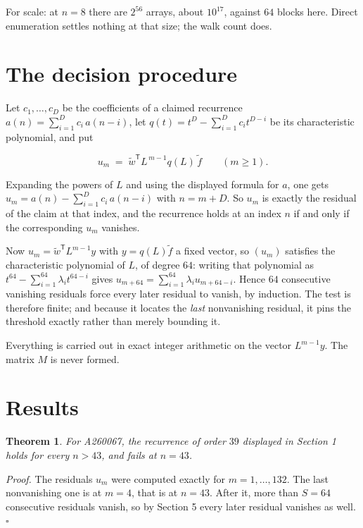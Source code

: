 \documentclass[11pt]{article}
\newtheorem{theorem}{Theorem}
\theoremstyle{definition}
\begin{document}
For scale: at $n = 8$ there are $2^{56}$ arrays, about $10^{17}$, against $64$ blocks here. Direct enumeration settles nothing at that size; the walk count does.

\section{The decision procedure}

Let $c_1,\dots,c_D$ be the coefficients of a claimed recurrence $a(n) = \sum_{i=1}^{D} c_i\,a(n-i)$, let $q(t) = t^{D} - \sum_{i=1}^{D} c_i t^{D-i}$ be its characteristic polynomial, and put

\[u_m \;=\; \tilde w^{\mathsf T} L^{\,m-1} q(L)\,\tilde f \qquad (m \ge 1).\]

Expanding the powers of $L$ and using the displayed formula for $a$, one gets $u_m = a(n) - \sum_{i=1}^{D} c_i\,a(n-i)$ with $n = m + D$. So $u_m$ is exactly the residual of the claim at that index, and the recurrence holds at an index $n$ if and only if the corresponding $u_m$ vanishes.

Now $u_m = \tilde w^{\mathsf T} L^{m-1} y$ with $y = q(L)\tilde f$ a fixed vector, so $(u_m)$ satisfies the characteristic polynomial of $L$, of degree $64$: writing that polynomial as $t^{64} - \sum_{i=1}^{64} \lambda_i t^{64-i}$ gives $u_{m+64} = \sum_{i=1}^{64} \lambda_i u_{m+64-i}$. Hence $64$ consecutive vanishing residuals force every later residual to vanish, by induction. The test is therefore finite; and because it locates the {\itshape last} nonvanishing residual, it pins the threshold exactly rather than merely bounding it.

Everything is carried out in exact integer arithmetic on the vector $L^{m-1}y$. The matrix $M$ is never formed.

\section{Results}

\begin{theorem} For A260067, the recurrence of order $39$ displayed in Section 1 holds for every $n > 43$, and fails at $n = 43$.\end{theorem}

{\itshape Proof.} The residuals $u_m$ were computed exactly for $m = 1,\dots,132$. The last nonvanishing one is at $m = 4$, that is at $n = 43$. After it, more than $S = 64$ consecutive residuals vanish, so by Section 5 every later residual vanishes as well. $\square$
\end{document}
